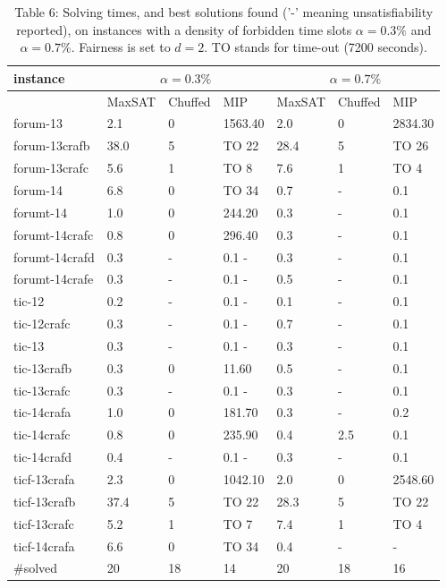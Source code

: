 \documentclass[10pt]{article}
\begin{document}
\begin{table}[h]
\begin{center}
\captionsetup{labelformat=empty}
\caption{Table 6: Solving times, and best solutions found ('-' meaning unsatisfiability reported), on instances with a density of forbidden time slots $\alpha=0.3 \%$ and $\alpha=0.7 \%$. Fairness is set to $d=2$. TO stands for time-out (7200 seconds).}
\begin{tabular}{|l|l|l|l|l|l|l|}
\hline
\multirow{2}{*}{instance} & \multicolumn{3}{|c|}{$\alpha=0.3 \%$} & \multicolumn{3}{|c|}{$\alpha=0.7 \%$} \\
\hline
 & MaxSAT & Chuffed & MIP & MaxSAT & Chuffed & MIP \\
\hline
forum-13 & 2.1 & 0 & 1563.40 & 2.0 & 0 & 2834.30 \\
\hline
forum-13crafb & 38.0 & 5 & TO 22 & 28.4 & 5 & TO 26 \\
\hline
forum-13crafc & 5.6 & 1 & TO 8 & 7.6 & 1 & TO 4 \\
\hline
forum-14 & 6.8 & 0 & TO 34 & 0.7 & - & 0.1 \\
\hline
forumt-14 & 1.0 & 0 & 244.20 & 0.3 & - & 0.1 \\
\hline
forumt-14crafc & 0.8 & 0 & 296.40 & 0.3 & - & 0.1 \\
\hline
forumt-14crafd & 0.3 & - & 0.1 - & 0.3 & - & 0.1 \\
\hline
forumt-14crafe & 0.3 & - & 0.1 - & 0.5 & - & 0.1 \\
\hline
tic-12 & 0.2 & - & 0.1 - & 0.1 & - & 0.1 \\
\hline
tic-12crafc & 0.3 & - & 0.1 - & 0.7 & - & 0.1 \\
\hline
tic-13 & 0.3 & - & 0.1 - & 0.3 & - & 0.1 \\
\hline
tic-13crafb & 0.3 & 0 & 11.60 & 0.5 & - & 0.1 \\
\hline
tic-13crafc & 0.3 & - & 0.1 - & 0.3 & - & 0.1 \\
\hline
tic-14crafa & 1.0 & 0 & 181.70 & 0.3 & - & 0.2 \\
\hline
tic-14crafc & 0.8 & 0 & 235.90 & 0.4 & 2.5 & 0.1 \\
\hline
tic-14crafd & 0.4 & - & 0.1 - & 0.3 & - & 0.1 \\
\hline
ticf-13crafa & 2.3 & 0 & 1042.10 & 2.0 & 0 & 2548.60 \\
\hline
ticf-13crafb & 37.4 & 5 & TO 22 & 28.3 & 5 & TO 22 \\
\hline
ticf-13crafc & 5.2 & 1 & TO 7 & 7.4 & 1 & TO 4 \\
\hline
ticf-14crafa & 6.6 & 0 & TO 34 & 0.4 & - & - \\
\hline
\#solved & 20 & 18 & 14 & 20 & 18 & 16 \\
\hline
\end{tabular}
\end{center}
\end{table}
\end{document}

